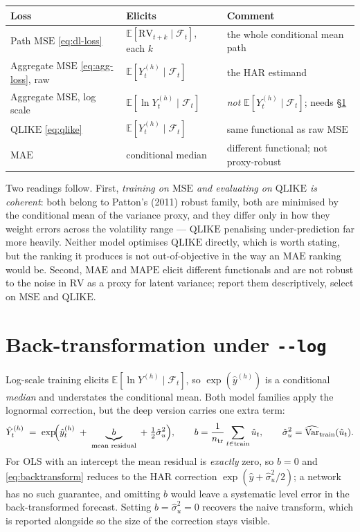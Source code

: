 \documentclass[11pt,a4paper]{article}
\newcommand{\RV}{\mathrm{RV}}
\newcommand{\E}{\mathbb{E}}
\newcommand{\Var}{\operatorname{Var}}
\newcommand{\Fset}{\mathcal{F}}
\newcommand{\MSE}{\mathrm{MSE}}
\newcommand{\MAE}{\mathrm{MAE}}
\newcommand{\QLIKE}{\mathrm{QLIKE}}
\begin{document}
\begin{center}
\begin{tabular}{@{}llp{5.6cm}@{}}
\toprule
Loss & Elicits & Comment \\
\midrule
Path $\MSE$ \eqref{eq:dl-loss}      & $\E[\RV_{t+k}\mid\Fset_t]$, each $k$ & the whole conditional mean path \\
Aggregate $\MSE$ \eqref{eq:agg-loss}, raw & $\E[Y^{(h)}_{t}\mid\Fset_t]$   & the HAR estimand \\
Aggregate $\MSE$, log scale         & $\E[\ln Y^{(h)}_{t}\mid\Fset_t]$     & \emph{not} $\E[Y^{(h)}_t\mid\Fset_t]$; needs \S\ref{sec:backtransform} \\
$\QLIKE$ \eqref{eq:qlike}           & $\E[Y^{(h)}_{t}\mid\Fset_t]$         & same functional as raw $\MSE$ \\
$\MAE$                              & conditional median                   & different functional; not proxy-robust \\
\bottomrule
\end{tabular}
\end{center}

Two readings follow. First, \emph{training on $\MSE$ and evaluating on $\QLIKE$ is
coherent}: both belong to Patton's (2011) robust family, both are minimised by the
conditional mean of the variance proxy, and they differ only in how they weight errors
across the volatility range --- $\QLIKE$ penalising under-prediction far more heavily.
Neither model optimises $\QLIKE$ directly, which is worth stating, but the ranking it
produces is not out-of-objective in the way an $\MAE$ ranking would be. Second, $\MAE$ and
$\mathrm{MAPE}$ elicit different functionals and are not robust to the noise in $\RV$ as a
proxy for latent variance; report them descriptively, select on $\MSE$ and $\QLIKE$.

\section{Back-transformation under \texttt{-{}-log}}
\label{sec:backtransform}

Log-scale training elicits $\E[\ln Y^{(h)}\mid\Fset_t]$, so $\exp(\hat{y}^{(h)})$ is a
conditional \emph{median} and understates the conditional mean. Both model families apply
the lognormal correction, but the deep version carries one extra term:
\begin{equation}
  \hat{Y}^{(h)}_{t}
  \;=\;
  \exp\!\Bigl(\hat{y}^{(h)}_{t} \;+\; \underbrace{b}_{\text{mean residual}} \;+\; \tfrac{1}{2}\hat\sigma_u^{2}\Bigr),
  \qquad
  b=\frac{1}{n_{\text{tr}}}\sum_{t\in\text{train}}\hat{u}_t,
  \qquad
  \hat\sigma_u^{2}=\widehat{\Var}_{\text{train}}(\hat{u}_t).
  \label{eq:backtransform}
\end{equation}
For OLS with an intercept the mean residual is \emph{exactly} zero, so $b=0$ and
\eqref{eq:backtransform} reduces to the HAR correction $\exp(\hat y+\hat\sigma_u^2/2)$; a
network has no such guarantee, and omitting $b$ would leave a systematic level error in the
back-transformed forecast. Setting $b=\hat\sigma_u^2=0$ recovers the naive transform, which
is reported alongside so the size of the correction stays visible.
\end{document}
